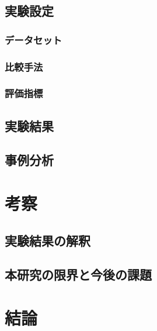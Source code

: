 \documentclass[12pt, a4paper]{jsarticle}
\begin{document}
\section{実験設定}
\label{sec:experimental_setup}

\subsection{データセット}
\label{subsec:datasets}

\subsection{比較手法}
\label{subsec:baselines}

\subsection{評価指標}
\label{subsec:evaluation_metrics}

\section{実験結果}
\label{sec:results}

\section{事例分析}
\label{sec:case_study}

\chapter{考察}
\label{chap:discussion}

\section{実験結果の解釈}
\label{sec:interpretation}

\section{本研究の限界と今後の課題}
\label{sec:limitations_future_work}

\chapter{結論}
\label{chap:conclusion}
\end{document}
